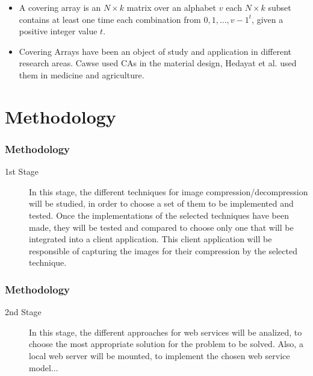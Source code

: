 \documentclass[compress]{beamer}
\begin{document}
\begin{frame}
	\begin{itemize}
	\item A covering array is an $N \times k$ matrix over an alphabet $v$ each $N \times k$ subset contains at least one time each combination from ${0,1,\ldots,v−1}^{t}$, given a positive integer value $t$.
	\end{itemize}
\end{frame}

\begin{frame}
	\begin{itemize}
	\item Covering Arrays have been an object of study and application in different research areas. Cawse \cite{Cawse:2003} used CAs in the material design, Hedayat et al. \cite{Hedayat:1999} used them in medicine and agriculture.
	\end{itemize}
\end{frame}

\section{Methodology}
\begin{frame}
	\frametitle{Methodology}
	\begin{description}
\item[1st Stage] In this stage, the different techniques for image compression/decompression will be studied, in order to choose a set of them to be implemented and tested. Once the implementations of the selected techniques have been made, they will be tested and compared to choose only one that will be integrated into a client application. This client application will be responsible of capturing the images for their compression by the selected technique.
\end{description}
\end{frame}

\begin{frame}
	\frametitle{Methodology}
	\begin{description}
\item[2nd Stage] In this stage, the different approaches for web services will be analized, to choose the most appropriate solution for the problem to be solved. Also, a local web server will be mounted, to implement the chosen web service model...
\end{description}
\end{frame}
\end{document}
